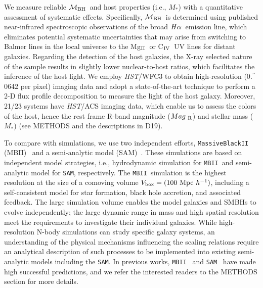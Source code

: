 \documentclass{natureprintstyle}
\newcommand{\hst}{{\it HST}}
\newcommand{\mbh}{$\mathcal M_{\rm BH}$}
\newcommand{\mr}{$Mag_{\rm ~R}$}
\newcommand{\halpha}{${\it H}\alpha$}
\newcommand{\mstar}{{$M_*$}}
\newcommand{\Mgii}{Mg$_{\rm II}$}
\newcommand{\Civ}{C$_{\rm IV}$}
\newcommand{\farcs}{\mbox{\ensuremath{.\!\!^{\prime\prime}}}}%
\newcommand{\sam}{\texttt{SAM}}
\newcommand{\mbii}{\texttt{MBII}}
\newcommand{\ding}[1]{\textcolor{red}{[{\bf Xuheng}: #1]}}
\begin{document}
We measure reliable \mbh\ and host properties (i.e., \mstar) with a quantitative assessment of systematic effects. Specifically, \mbh\ is determined using published near-infrared spectroscopic observations of the broad \halpha\ emission line, which eliminates potential systematic uncertainties that may arise from switching to Balmer lines in the local universe to the \Mgii\ or \Civ\ UV lines for distant galaxies. Regarding the detection of the host galaxies, the X-ray selected nature of the sample results in slightly lower nuclear-to-host ratios, which facilitates the inference of the host light. We employ \hst/WFC3 to obtain high-resolution (0\farcs0642 per pixel) imaging data and adopt a state-of-the-art technique to perform a 2-D flux profile decomposition to measure the light of the host galaxy. Moreover, 21/23 systems have \hst/ACS imaging data, which enable us to assess the colors of the host, hence the rest frame R-band magnitude (\mr) and stellar mass (\mstar) (see METHODS and the descriptions in D19). 


To compare with simulations, we use two independent efforts, \texttt{MassiveBlackII} (MBII)~\cite{Khandai2015} and a semi-analytic model (SAM)~\cite{Menci2014}. These simulations are based on independent model strategies, i.e., hydrodynamic simulation for \mbii\ and semi-analytic model for \sam, respectively. The \mbii\ simulation is the highest resolution at the size of a comoving volume $V_{\rm box} = (100~{\rm Mpc}~h^{-1})$, including a self-consistent model for star formation, black hole accretion, and associated feedback. The large simulation volume enables the model galaxies and SMBHs to evolve independently; the large dynamic range in mass and high spatial resolution meet the requirements to investigate their individual galaxies. While high-resolution N-body simulations can study specific galaxy systems, an understanding of the physical mechanisms influencing the scaling relations require an analytical description of such processes to be implemented into existing semi-analytic models including the \sam. In previous works, \mbii~\cite{Huang2018, DeG++15, Khandai2015,Bhowmick2019} and \sam~\cite{Menci2014, Menci2016} have made high successful predictions, and we refer the interested readers to the METHODS section for more details.
\end{document}
